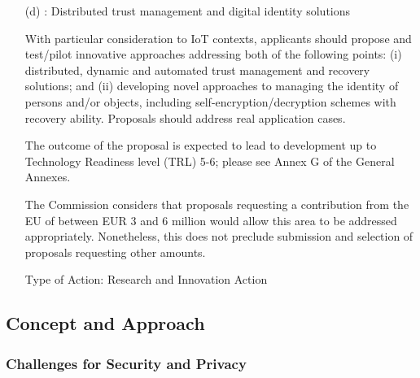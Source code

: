 \documentclass[a4paper,11pt]{article}
\begin{document}
{{\begin{itemize}
The outcome of the proposal is expected to lead to development up to Technology Readiness level (TRL) 6; please see Annex G of the General Annexes.

The Commission considers that proposals requesting a contribution from the EU of between EUR 2 and 5 million would allow this specific challenge to be addressed appropriately. Nonetheless, this does not preclude submission and selection of proposals requesting other amounts.

Type of Action: Research and Innovation Action

\item[(d)]: Distributed trust management and digital identity solutions

With particular consideration to IoT contexts, applicants should propose and test/pilot innovative approaches addressing both of the following points: (i) distributed, dynamic and automated trust management and recovery solutions; and (ii) developing novel approaches to managing the identity of persons and/or objects, including self-encryption/decryption schemes with recovery ability. Proposals should address real application cases.

The outcome of the proposal is expected to lead to development up to Technology Readiness level (TRL) 5-6; please see Annex G of the General Annexes.

The Commission considers that proposals requesting a contribution from the EU of between EUR 3 and 6 million would allow this area to be addressed appropriately. Nonetheless, this does not preclude submission and selection of proposals requesting other amounts.

Type of Action: Research and Innovation Action
\end{itemize}

}}


\subsection{Concept and Approach}


\vspace{-6pt}

\subsubsection{Challenges for Security and Privacy}
\end{document}
